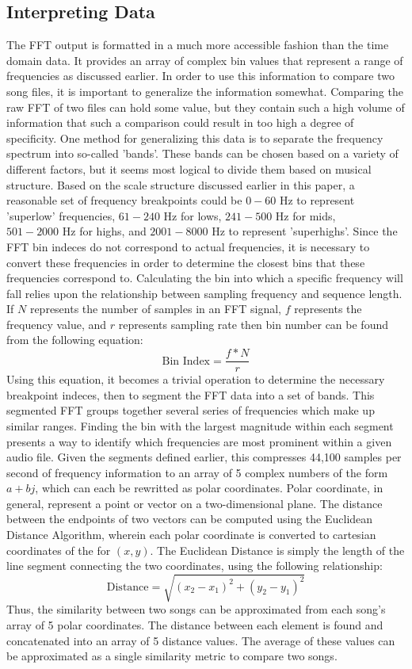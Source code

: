 \documentclass[conference]{IEEEtran}
\begin{document}
\subsection{Interpreting Data}
The FFT output is formatted in a much more accessible fashion than the time domain data. It provides an array of complex bin values that represent a range of frequencies as discussed earlier. In order to use this information to compare two song files, it is important to generalize the information somewhat. Comparing the raw FFT of two files can hold some value, but they contain such a high volume of information that such a comparison could result in too high a degree of specificity. One method for generalizing this data is to separate the frequency spectrum into so-called 'bands'. These bands can be chosen based on a variety of different factors, but it seems most logical to divide them based on musical structure. Based on the scale structure discussed earlier in this paper, a reasonable set of frequency breakpoints could be $0-60\text{ Hz}$ to represent 'superlow' frequencies, $61-240\text{ Hz}$ for lows, $241-500\text{ Hz}$ for mids, $501-2000\text{ Hz}$ for highs, and $2001-8000\text{ Hz}$ to represent 'superhighs'. Since the FFT bin indeces do not correspond to actual frequencies, it is necessary to convert these frequencies in order to determine the closest bins that these frequencies correspond to. Calculating the bin into which a specific frequency will fall relies upon the relationship between sampling frequency and sequence length. If $N$ represents the number of samples in an FFT signal, $f$ represents the frequency value, and $r$ represents sampling rate then bin number can be found from the following equation:
\begin{equation}\label{BinNum}
  \text{Bin Index}=\frac{f * N}{r}
\end{equation}
Using this equation, it becomes a trivial operation to determine the necessary breakpoint indeces, then to segment the FFT data into a set of bands. This segmented FFT groups together several series of frequencies which make up similar ranges. Finding the bin with the largest magnitude within each segment presents a way to identify which frequencies are most prominent within a given audio file. Given the segments defined earlier, this compresses 44,100 samples per second of frequency information to an array of 5 complex numbers of the form $a+bj$, which can each be rewritted as polar coordinates. Polar coordinate, in general, represent a point or vector on a two-dimensional plane. The distance between the endpoints of two vectors can be computed using the Euclidean Distance Algorithm, wherein each polar coordinate is converted to cartesian coordinates of the for $(x,y)$. The Euclidean Distance is simply the length of the line segment connecting the two coordinates, using the following relationship:
\begin{equation}\label{Euclidean}
  \text{Distance}=\sqrt{(x_2-x_1)^2 + (y_2-y_1)^2}
\end{equation}
Thus, the similarity between two songs can be approximated from each song's array of 5 polar coordinates. The distance between each element is found and concatenated into an array of 5 distance values. The average of these values can be approximated as a single similarity metric to compare two songs.
\end{document}
